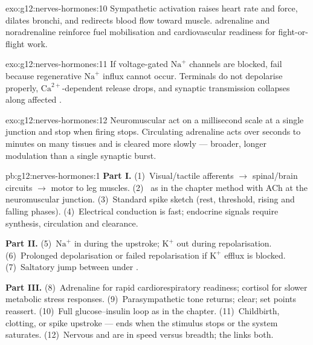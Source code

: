 \begin{solution}{exo:g12:nerves-hormones:10}
Sympathetic activation raises heart rate and force, dilates bronchi, and
redirects blood flow toward muscle.  adrenaline and noradrenaline
reinforce fuel mobilisation and cardiovascular readiness for fight-or-flight
work.
\end{solution}

\begin{solution}{exo:g12:nerves-hormones:11}
If voltage-gated $\mathrm{Na}^{+}$ channels are blocked, 
fail because regenerative $\mathrm{Na}^{+}$ influx cannot occur. Terminals do
not depolarise properly, $\mathrm{Ca}^{2+}$-dependent release drops, and
synaptic transmission collapses along affected .
\end{solution}

\begin{solution}{exo:g12:nerves-hormones:12}
Neuromuscular  act on a millisecond scale at a single
junction and stop when firing stops. Circulating adrenaline acts over seconds
to minutes on many tissues and is cleared more slowly --- broader, longer
modulation than a single synaptic burst.
\end{solution}

\begin{solution}{pb:g12:nerves-hormones:1}
\textbf{Part I.} (1)~Visual/tactile afferents $\to$ spinal/brain circuits $\to$
motor  to leg muscles. (2)~  as in the chapter method
with ACh at the neuromuscular junction. (3)~Standard spike sketch (rest,
threshold, rising and falling phases). (4)~Electrical conduction is fast;
endocrine signals require synthesis, circulation and clearance.

\textbf{Part II.} (5)~$\mathrm{Na}^{+}$ in during the upstroke; $\mathrm{K}^{+}$
out during repolarisation. (6)~Prolonged depolarisation or failed
repolarisation if $\mathrm{K}^{+}$ efflux is blocked. (7)~Saltatory jump
between  under .

\textbf{Part III.} (8)~Adrenaline for rapid cardiorespiratory readiness;
cortisol for slower metabolic stress responses. (9)~Parasympathetic tone
returns;  clear; set points reassert. (10)~Full glucose--insulin loop
as in the chapter. (11)~Childbirth, clotting, or spike upstroke ---  ends when the stimulus stops or the system saturates.
(12)~Nervous and  are  in speed versus breadth;
the  links both.
\end{solution}
